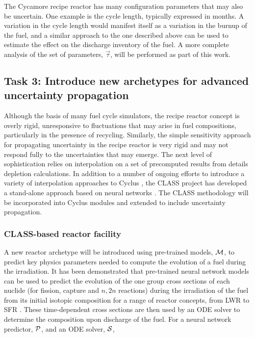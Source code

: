 \documentclass[dvips,12pt]{article}
\begin{document}
The Cycamore recipe reactor has many configuration
parameters that may also be uncertain.  One
example is the cycle length, typically expressed
in months.  A variation in the cycle length would
manifest itself as a variation in the burnup of
the fuel, and a similar approach to the one
described above can be used to estimate the effect
on the discharge inventory of the fuel.  A more
complete analysis of the set of parameters,
$\vec{\tau}$, will be performed as part of this work.

\subsection{Task 3: Introduce new archetypes for advanced uncertainty propagation}

Although the basis of many fuel cycle simulators,
the recipe reactor concept is overly rigid,
unresponsive to fluctuations that may arise in fuel
compositions, particularly in the presence of
recycling.  Similarly, the simple sensitivity
approach for propagating uncertainty in the recipe
reactor is very rigid and may not respond fully to
the uncertainties that may emerge.  The next level
of sophistication relies on interpolation on a set
of precomputed results from details depletion
calculations.  In addition to a number of ongoing
efforts to introduce a variety of interpolation
approaches to Cyclus \cite{brightlite, cyborg}, the
CLASS project\cite{CLASS} has developed a
stand-alone approach based on neural networks \cite{Leniau.ANE.2015}. The
CLASS methodology will be incorporated into Cyclus
modules and extended to include uncertainty
propagation.

\subsubsection{CLASS-based reactor facility} \label{sec:reactors}

A new reactor archetype will be introduced using
pre-trained models, ${\cal M}$, to predict key
physics parameters needed to compute the evolution
of a fuel during the irradiation. It has been
demonstrated that pre-trained neural network
models can be used to predict the evolution of the
one group cross sections of each nuclide (for
fission, capture and $n,2n$ reactions) during the
irradiation of the fuel from its initial isotopic
composition for a range of reactor concepts, from
LWR to SFR \cite{Leniau.ANE.2015, Leniau.PHYSOR.2016}.
These time-dependent cross sections are then used
by an ODE solver to determine the composition upon
discharge of the fuel.  For a neural network
predictor, ${\cal P}$, and an ODE solver, ${\cal S}$,
\end{document}

